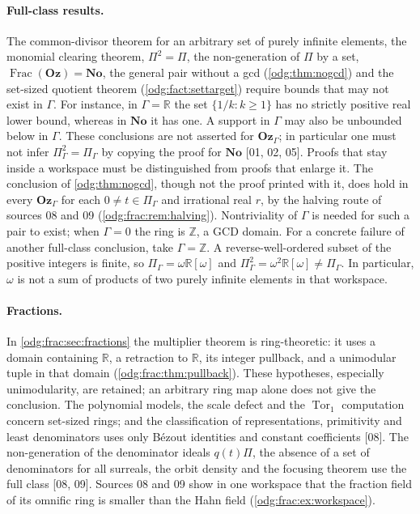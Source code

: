 \documentclass[11pt,oneside]{article}
\numberwithin{equation}{section}
\theoremstyle{definition}
\theoremstyle{remark}
\newcommand{\No}{\mathbf{No}}
\newcommand{\Oz}{\mathbf{Oz}}
\newcommand{\Z}{\mathbb Z}
\newcommand{\R}{\mathbb R}
\newcommand{\Frac}{\operatorname{Frac}}
\newcommand{\src}[1]{\textup{\textsf{\small[#1]}}}
\newcommand{\Tor}{\operatorname{Tor}}
\begin{document}
\paragraph{Full-class results.} The common-divisor theorem for an arbitrary
set of purely infinite elements, the monomial clearing theorem, $\Pi^2=\Pi$,
the non-generation of $\Pi$ by a set, $\Frac(\Oz)=\No$, the general pair
without a gcd (\cref{odg:thm:nogcd}) and the set-sized quotient theorem
(\cref{odg:fact:settarget}) require bounds that may not exist in $\Gamma$.
For instance, in $\Gamma=\R$ the set $\{1/k:k\geq1\}$ has no strictly
positive real lower bound, whereas in $\No$ it has one. A support in $\Gamma$
may also be unbounded below in $\Gamma$. These conclusions are not asserted
for $\Oz_\Gamma$; in particular one must not infer $\Pi_\Gamma^2=\Pi_\Gamma$ by
copying the proof for $\No$ \src{01, 02, 05}. Proofs that stay inside a
workspace must be distinguished from proofs that enlarge it. The conclusion of
\cref{odg:thm:nogcd}, though not the proof printed with it, does hold in every
$\Oz_\Gamma$ for each $0\ne t\in\Pi_\Gamma$ and irrational real $r$,
by the halving route of sources 08 and 09
(\cref{odg:frac:rem:halving}). Nontriviality of $\Gamma$ is needed for
such a pair to exist; when $\Gamma=0$ the ring is $\Z$, a GCD domain.
For a concrete failure of another full-class conclusion, take $\Gamma=\Z$.
A reverse-well-ordered subset of the positive integers is finite, so
$\Pi_\Gamma=\omega\R[\omega]$ and
$\Pi_\Gamma^2=\omega^2\R[\omega]\ne\Pi_\Gamma$. In particular,
$\omega$ is not a sum of products of two purely infinite elements in
that workspace.

\paragraph{Fractions.} In \cref{odg:frac:sec:fractions} the multiplier theorem
is ring-theoretic: it uses a domain containing $\R$, a retraction to
$\R$, its integer pullback, and a unimodular tuple in that domain
(\cref{odg:frac:thm:pullback}). These hypotheses, especially unimodularity,
are retained; an arbitrary ring map alone does not give the conclusion.
The polynomial models, the scale defect and the
$\Tor_1$ computation concern set-sized rings; and the classification of
representations, primitivity and least denominators uses only B\'ezout
identities and constant coefficients \src{08}. The non-generation of the
denominator ideals $q(t)\Pi$, the absence of a set of denominators for all
surreals, the orbit density and the focusing theorem use the full class
\src{08, 09}. Sources 08 and 09 show in one workspace that the fraction field
of its omnific ring is smaller than the Hahn field (\cref{odg:frac:ex:workspace}).
\end{document}
